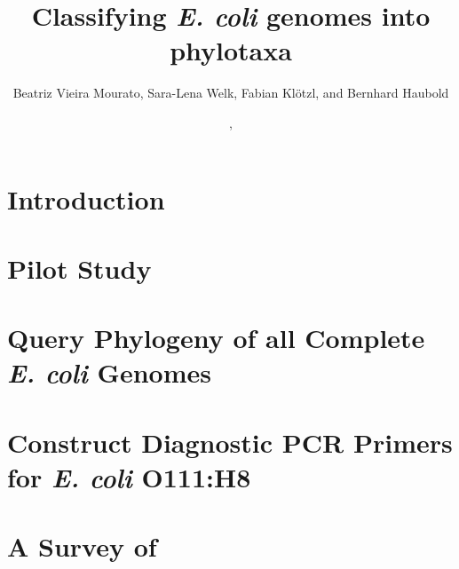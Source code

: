 \documentclass[a4paper]{report}
\title{Classifying \emph{E. coli} genomes into phylotaxa\\
  \small\ty{github.com/evolbioinf/ecos}}
\author{Beatriz Vieira Mourato, Sara-Lena Welk, Fabian Klötzl, and Bernhard Haubold}
\date{\!\!, }
\begin{document}
\maketitle
\tableofcontents

\chapter{Introduction}

\chapter{Pilot Study}\label{ch:p}

\chapter{Query Phylogeny of all Complete \emph{E. coli} Genomes}\label{ch:q}

\chapter{Construct Diagnostic PCR Primers for \emph{E. coli} O111:H8}\label{ch:m}

\appendix
\chapter{A Survey of }



\end{document}

